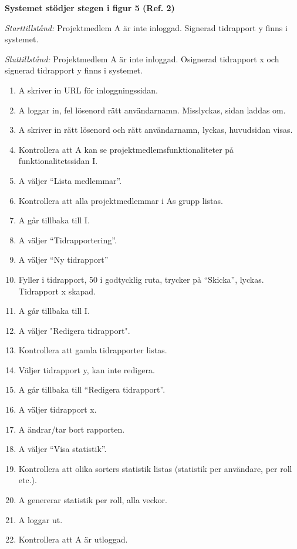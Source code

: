 \documentclass[a4paper]{article}
\begin{document}
\begin{ST}
\item
\textbf{Systemet stödjer stegen i figur 5 (Ref. 2)} 

\emph{Starttillstånd:} Projektmedlem A är inte inloggad. Signerad tidrapport y finns i systemet.

\emph{Sluttillstånd:} Projektmedlem A är inte inloggad. Osignerad tidrapport x och signerad tidrapport y finns i systemet.

\begin{enumerate}

\item A skriver in URL för inloggningssidan.
\item A loggar in, fel lösenord rätt användarnamn. Misslyckas, sidan laddas om.
\item A skriver in rätt lösenord och rätt användarnamn, lyckas, huvudsidan visas.
\item Kontrollera att A kan se projektmedlemsfunktionaliteter på funktionalitetssidan I.
\item A väljer ``Lista medlemmar''.
\item Kontrollera att alla projektmedlemmar i As grupp listas.
\item A går tillbaka till I.
\item A väljer ``Tidrapportering''.
\item A väljer ``Ny tidrapport''
\item Fyller i tidrapport, 50 i godtycklig ruta, trycker på ``Skicka'', lyckas. Tidrapport x skapad.
\item A går tillbaka till I.
\item A väljer "Redigera tidrapport".
\item Kontrollera att gamla tidrapporter listas.
\item Väljer tidrapport y, kan inte redigera.
\item A går tillbaka till ``Redigera tidrapport''.
\item A väljer tidrapport x.
\item A ändrar/tar bort rapporten.
\item A väljer ``Visa statistik''.
\item Kontrollera att olika sorters statistik listas (statistik per användare, per roll etc.).
\item A genererar statistik per roll, alla veckor.
\item A loggar ut.
\item Kontrollera att A är utloggad.

\end {enumerate}



\end{ST}
\end{document}
